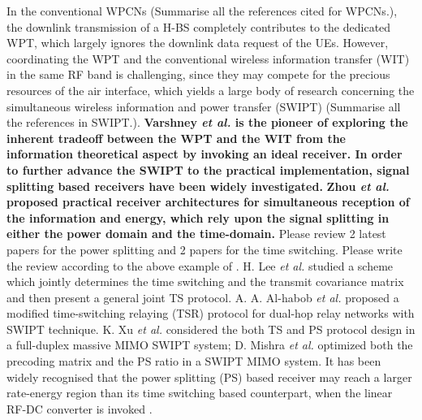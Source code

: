 \documentclass[12pt,draftcls,onecolumn,journal]{IEEEtran}
\begin{document}
In the conventional WPCNs \cite{wpcn_1,wpcn_2,wpcn_3,wpcn_4,wpcn_5,wpcn_6,wpcn_7,wpcn_8,wpcn_9,wpcn_10,wpcn_11
}{\color{red} (Summarise all the references cited for WPCNs.)}, the downlink transmission of a H-BS completely contributes to the dedicated WPT, which largely ignores the downlink data request of the UEs. However, coordinating the WPT and the conventional wireless information transfer (WIT) in the same RF band is challenging, since they may compete for the precious resources of the air interface, which yields a large body of research concerning the simultaneous wireless information and power transfer (SWIPT) \cite{swipt_5,swipt_6, TS_1, TS_2, PS_1, PS_2} {\color{red} (Summarise all the references in SWIPT.)}. \textbf{Varshney \textit{et al.} \cite{swipt_5} is the pioneer of exploring the inherent tradeoff between the WPT and the WIT from the information theoretical aspect by invoking an ideal receiver. In order to further advance the SWIPT to the practical implementation, signal splitting based receivers have been widely investigated.} \textbf{Zhou \textit{et al.} \cite{swipt_6} proposed practical receiver architectures for simultaneous reception of the information and energy, which rely upon the signal splitting in either the power domain and the time-domain.} {\color{red} Please review 2 latest papers for the power splitting and 2 papers for the time switching. Please write the review according to the above example of \cite{swipt_5,swipt_6}.} H. Lee \textit{et al.} \cite{TS_1} studied a scheme which jointly determines the time switching and the transmit covariance matrix and then present a general joint TS protocol. A. A. Al-habob \textit{et al.} \cite{TS_2} proposed a modified time-switching relaying (TSR) protocol for dual-hop relay networks with SWIPT technique. K. Xu \textit{et al.} \cite{PS_1} considered the both TS and PS protocol design in a full-duplex massive MIMO SWIPT system; D. Mishra \textit{et al.} \cite{PS_2} optimized both the precoding matrix and the PS ratio in a SWIPT MIMO system. It has been widely recognised that the power splitting (PS) based receiver may reach a larger rate-energy region than its time switching based counterpart, when the linear RF-DC converter is invoked \cite{swipt_5}.
\end{document}
